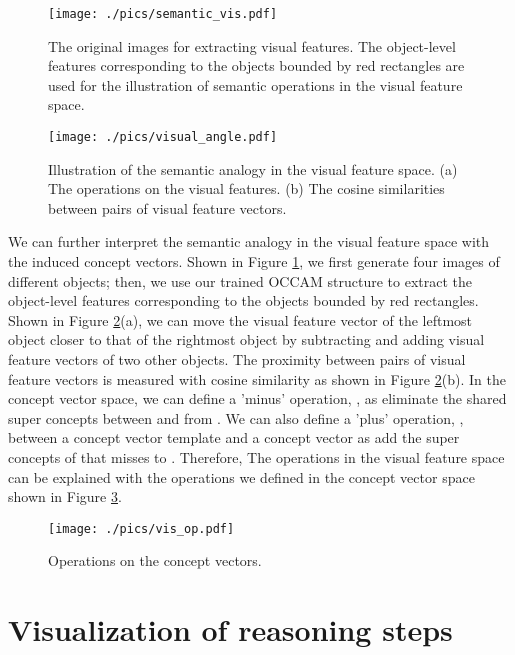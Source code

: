 \documentclass[final]{cvpr}
\begin{document}
\begin{figure}
\centering
\texttt{[image: ./pics/semantic\_vis.pdf]}
\caption{The original images for extracting visual features. The object-level features corresponding to the objects bounded by red rectangles are used for the illustration of semantic operations in the visual feature space. }
\label{semantic_vis}
\end{figure}

\begin{figure}
\centering
\texttt{[image: ./pics/visual\_angle.pdf]}
\caption{Illustration of the semantic analogy in the visual feature space. (a) The operations on the visual features. (b) The cosine similarities between pairs of visual feature vectors. }
\label{visual_angle}
\end{figure}

We can further interpret the semantic analogy in the visual feature space with the induced concept vectors. Shown in Figure \ref{semantic_vis}, we first generate four images of different objects; then, we use our trained OCCAM structure to extract the object-level features corresponding to the objects bounded by red rectangles. Shown in Figure \ref{visual_angle}(a), we can move the visual feature vector of the leftmost object closer to that of the rightmost object by subtracting and adding visual feature vectors of two other objects. The proximity between pairs of visual feature vectors is measured with cosine similarity as shown in Figure \ref{visual_angle}(b). In the concept vector space, we can define a 'minus' operation, , as eliminate the shared super concepts between  and  from . We can also define a 'plus' operation, , between a concept vector template  and a concept vector  as add the super concepts of  that  misses to . Therefore, The operations in the visual feature space can be explained with the operations we defined in the concept vector space shown in Figure \ref{vis_op}.




\begin{figure}
\centering
\texttt{[image: ./pics/vis\_op.pdf]}
\caption{Operations on the concept vectors.}
\label{vis_op}
\end{figure}

\section{Visualization of reasoning steps}
\end{document}
